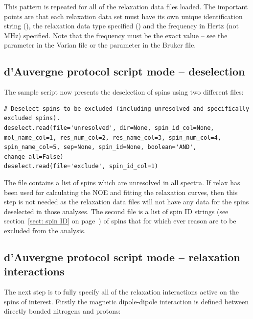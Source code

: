 \begin{htmlonly}
\begin{htmlonly}
This pattern is repeated for all of the relaxation data files loaded.  The important points are that each relaxation data set must have its own unique identification string (), the relaxation data type specified () and the frequency in Hertz (not MHz) specified.  Note that the frequency must be the exact value -- see the  parameter in the Varian  file or the  parameter in the Bruker  file.



\subsection{d'Auvergne protocol script mode -- deselection}

The sample script now presents the deselection of spins using two different files:

\begin{lstlisting}[firstnumber=188]
# Deselect spins to be excluded (including unresolved and specifically excluded spins).
deselect.read(file='unresolved', dir=None, spin_id_col=None, mol_name_col=1, res_num_col=2, res_name_col=3, spin_num_col=4, spin_name_col=5, sep=None, spin_id=None, boolean='AND', change_all=False)
deselect.read(file='exclude', spin_id_col=1)
\end{lstlisting}

The  file contains a list of spins which are unresolved in all spectra.  If relax has been used for calculating the NOE and fitting the relaxation curves, then this step is not needed as the relaxation data files will not have any data for the spins deselected in those analyses.  The second file  is a list of spin ID strings (see section~\ref{sect: spin ID} on page~\pageref{sect: spin ID}) of spins that for which ever reason are to be excluded from the analysis.



\subsection{d'Auvergne protocol script mode -- relaxation interactions}

The next step is to fully specify all of the relaxation interactions active on the spins of interest.  Firstly the magnetic dipole-dipole interaction is defined between directly bonded nitrogens and protons:


\end{htmlonly}
\end{htmlonly}
